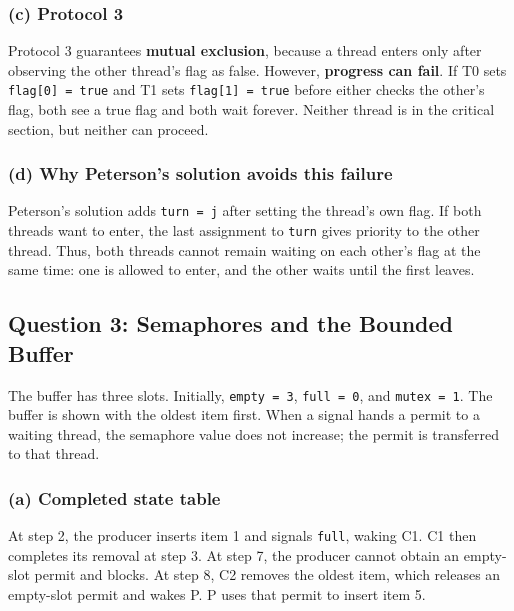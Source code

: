 \documentclass[conference]{IEEEtran}
\begin{document}
\subsubsection{(c) Protocol 3}
Protocol 3 guarantees \textbf{mutual exclusion}, because a thread enters only after observing the other thread's flag as false. However, \textbf{progress can fail}. If T0 sets \texttt{flag[0] = true} and T1 sets \texttt{flag[1] = true} before either checks the other's flag, both see a true flag and both wait forever. Neither thread is in the critical section, but neither can proceed.

\subsubsection{(d) Why Peterson's solution avoids this failure}
Peterson's solution adds \texttt{turn = j} after setting the thread's own flag. If both threads want to enter, the last assignment to \texttt{turn} gives priority to the other thread. Thus, both threads cannot remain waiting on each other's flag at the same time: one is allowed to enter, and the other waits until the first leaves.

\subsection{Question 3: Semaphores and the Bounded Buffer}

The buffer has three slots. Initially, \texttt{empty = 3}, \texttt{full = 0}, and \texttt{mutex = 1}. The buffer is shown with the oldest item first. When a signal hands a permit to a waiting thread, the semaphore value does not increase; the permit is transferred to that thread.

\subsubsection{(a) Completed state table}
At step 2, the producer inserts item 1 and signals \texttt{full}, waking C1. C1 then completes its removal at step 3. At step 7, the producer cannot obtain an empty-slot permit and blocks. At step 8, C2 removes the oldest item, which releases an empty-slot permit and wakes P. P uses that permit to insert item 5.
\end{document}
